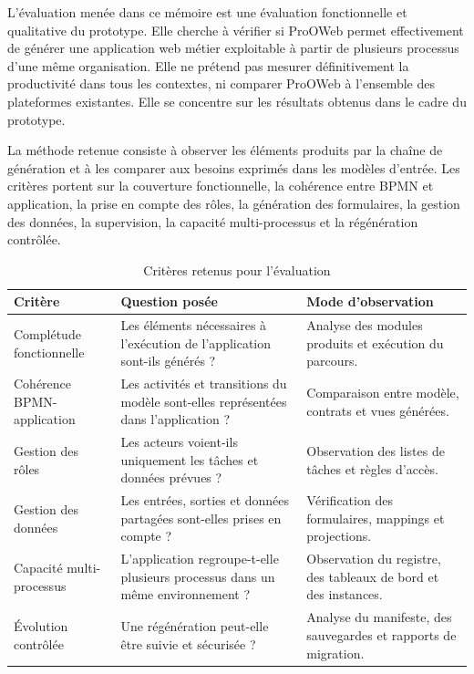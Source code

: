 L'évaluation menée dans ce mémoire est une évaluation fonctionnelle et qualitative du prototype. Elle cherche à vérifier si ProOWeb permet effectivement de générer une application web métier exploitable à partir de plusieurs processus d'une même organisation. Elle ne prétend pas mesurer définitivement la productivité dans tous les contextes, ni comparer ProOWeb à l'ensemble des plateformes existantes. Elle se concentre sur les résultats obtenus dans le cadre du prototype.

La méthode retenue consiste à observer les éléments produits par la chaîne de génération et à les comparer aux besoins exprimés dans les modèles d'entrée. Les critères portent sur la couverture fonctionnelle, la cohérence entre BPMN et application, la prise en compte des rôles, la génération des formulaires, la gestion des données, la supervision, la capacité multi-processus et la régénération contrôlée.

\begin{table}[H]
\centering
\small
\caption{Critères retenus pour l'évaluation}
\label{tab:chap4-criteres-evaluation}
\begin{tabular}{p{3.8cm}p{6.0cm}p{3.8cm}}
\hline
\textbf{Critère} & \textbf{Question posée} & \textbf{Mode d'observation} \\
\hline
Complétude fonctionnelle & Les éléments nécessaires à l'exécution de l'application sont-ils générés ? & Analyse des modules produits et exécution du parcours. \\
Cohérence BPMN-application & Les activités et transitions du modèle sont-elles représentées dans l'application ? & Comparaison entre modèle, contrats et vues générées. \\
Gestion des rôles & Les acteurs voient-ils uniquement les tâches et données prévues ? & Observation des listes de tâches et règles d'accès. \\
Gestion des données & Les entrées, sorties et données partagées sont-elles prises en compte ? & Vérification des formulaires, mappings et projections. \\
Capacité multi-processus & L'application regroupe-t-elle plusieurs processus dans un même environnement ? & Observation du registre, des tableaux de bord et des instances. \\
Évolution contrôlée & Une régénération peut-elle être suivie et sécurisée ? & Analyse du manifeste, des sauvegardes et rapports de migration. \\
\hline
\end{tabular}
\end{table}


